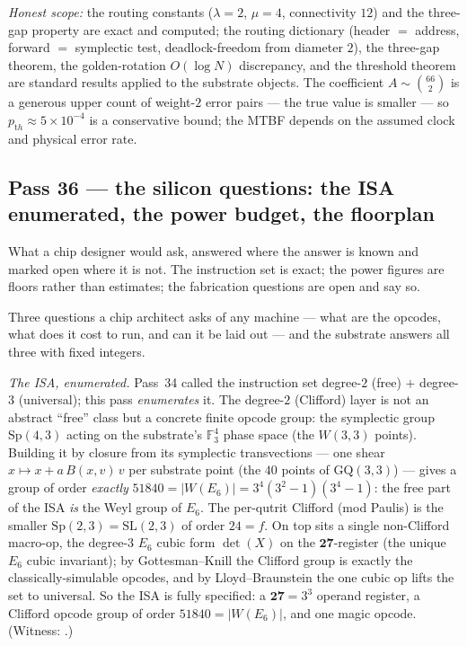 \documentclass[11pt]{article}
\begin{document}
\emph{Honest scope:} the routing constants ($\lambda=2$, $\mu=4$, connectivity $12$) and the
three-gap property are exact and computed; the routing dictionary (header $=$ address, forward $=$
symplectic test, deadlock-freedom from diameter $2$), the three-gap theorem, the golden-rotation
$O(\log N)$ discrepancy, and the threshold theorem are standard results applied to the substrate
objects. The coefficient $A\sim\binom{66}{2}$ is a generous upper count of weight-$2$ error pairs ---
the true value is smaller --- so $p_{\mathrm th}\approx5\times10^{-4}$ is a conservative bound; the
MTBF depends on the assumed clock and physical error rate.

\subsection{Pass 36 --- the silicon questions: the ISA enumerated, the power budget, the floorplan}

\begin{plainbox}
What a chip designer would ask, answered where the answer is known and marked open
where it is not. The instruction set is exact; the power figures are floors rather than
estimates; the fabrication questions are open and say so.
\end{plainbox}

\label{sec:capstone-thirtysix}

Three questions a chip architect asks of any machine --- what are the opcodes, what does it cost to
run, and can it be laid out --- and the substrate answers all three with fixed integers.

\emph{The ISA, enumerated.} Pass~34 called the instruction set degree-$2$ (free) $+$ degree-$3$
(universal); this pass \emph{enumerates} it. The degree-$2$ (Clifford) layer is not an abstract
``free'' class but a concrete finite opcode group: the symplectic group $\mathrm{Sp}(4,3)$ acting on
the substrate's $\mathbb{F}_3^4$ phase space (the $W(3,3)$ points). Building it by closure from its
symplectic transvections --- one shear $x\mapsto x+a\,B(x,v)\,v$ per substrate point (the $40$ points
of $\mathrm{GQ}(3,3)$) --- gives a group of order \emph{exactly}
$51840=|W(E_6)|=3^4(3^2-1)(3^4-1)$: the free part of the ISA \emph{is} the Weyl group of $E_6$. The
per-qutrit Clifford (mod Paulis) is the smaller $\mathrm{Sp}(2,3)=\mathrm{SL}(2,3)$ of order $24=f$.
On top sits a single non-Clifford macro-op, the degree-$3$ $E_6$ cubic form $\det(X)$ on the
$\mathbf{27}$-register (the unique $E_6$ cubic invariant); by Gottesman--Knill the Clifford group is
exactly the classically-simulable opcodes, and by Lloyd--Braunstein the one cubic op lifts the set to
universal. So the ISA is fully specified: a $\mathbf{27}=3^3$ operand register, a Clifford opcode
group of order $51840=|W(E_6)|$, and one magic opcode. (Witness: .)
\end{document}
